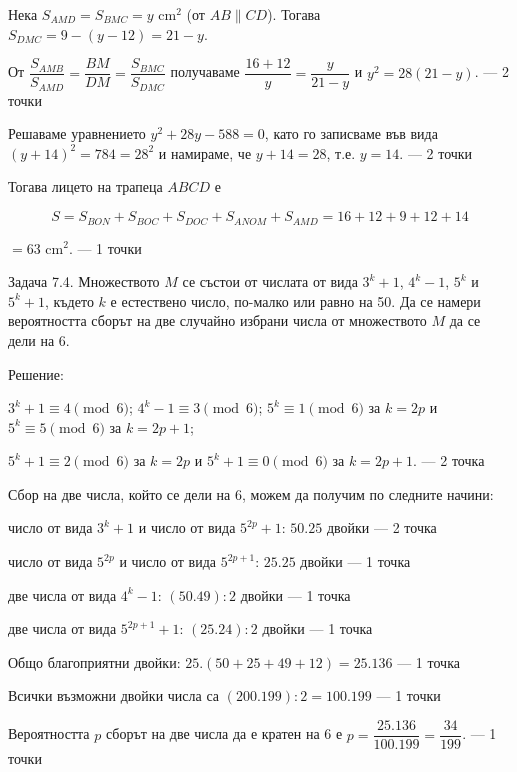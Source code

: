 Нека $S_{AMD}=S_{BMC}=y$ cm$^2$ (от $AB\parallel CD$). Тогава $S_{DMC}=9-(y-12)=21-y$.

От $\dfrac{S_{AMB}}{S_{AMD}}=\dfrac{BM}{DM}=\dfrac{S_{BMC}}{S_{DMC}}$ получаваме $\dfrac{16+12}{y}=\dfrac{y}{21-y}$ и $y^2=28(21-y)$. — 2 точки

Решаваме уравнението $y^2+28y-588=0$, като го записваме във вида $(y+14)^2=784=28^2$ и намираме, че $y+14=28$, т.е. $y=14$. — 2 точки

Тогава лицето на трапеца $ABCD$ е

$$S=S_{BON}+S_{BOC}+S_{DOC}+S_{ANOM}+S_{AMD}=16+12+9+12+14$$

$=63$ cm$^2$. — 1 точки

Задача 7.4. Множеството $M$ се състои от числата от вида $3^k+1$, $4^k-1$, $5^k$ и $5^k+1$, където $k$ е естествено число, по-малко или равно на 50. Да се намери вероятността сборът на две случайно избрани числа от множеството $M$ да се дели на 6.

Решение:

$3^k+1\equiv4\pmod 6$; $4^k-1\equiv3\pmod 6$; $5^k\equiv1\pmod 6$ за $k=2p$ и $5^k\equiv5\pmod 6$ за $k=2p+1$;

$5^k+1\equiv2\pmod 6$ за $k=2p$ и $5^k+1\equiv0\pmod 6$ за $k=2p+1$. — 2 точка

Сбор на две числа, който се дели на 6, можем да получим по следните начини:

число от вида $3^k+1$ и число от вида $5^{2p}+1$: $50.25$ двойки — 2 точка

число от вида $5^{2p}$ и число от вида $5^{2p+1}$: $25.25$ двойки — 1 точка

две числа от вида $4^k-1$: $(50.49):2$ двойки — 1 точка

две числа от вида $5^{2p+1}+1$: $(25.24):2$ двойки — 1 точка

Общо благоприятни двойки: $25.(50+25+49+12)=25.136$ — 1 точка

Всички възможни двойки числа са $(200.199):2=100.199$ — 1 точки

Вероятността $p$ сборът на две числа да е кратен на 6 е $p=\dfrac{25.136}{100.199}=\dfrac{34}{199}$. — 1 точки
